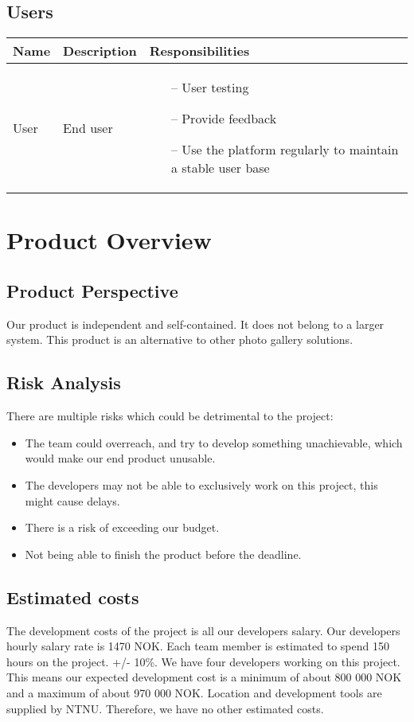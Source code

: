 \documentclass{article}
\begin{document}
\subsection{Users}
\begin{tabularx}{1.0\textwidth} { 
  | >{\raggedright\arraybackslash}X 
  | >{\raggedright\arraybackslash}X
  | >{\raggedright\arraybackslash}X | }
    \hline
    \rowcolor{lightgray} Name & Description & Responsibilities \\
    \hline
    User & End user & \begin{itemize}
        \item[--] User testing
        \item[--] Provide feedback
        \item[--] Use the platform regularly to maintain a stable user base
    \end{itemize}{} \\
    \hline
\end{tabularx}


\section{Product Overview}
\subsection{Product Perspective}
Our product is independent and self-contained. It does not belong to a larger system. This product is an alternative to other photo gallery solutions. 
\subsection{Risk Analysis}
There are multiple risks which could be detrimental to the project: 
\begin{itemize}
\item The team could overreach, and try to develop something unachievable, which would make our end product unusable.
\item The developers may not be able to exclusively work on this project, this might cause delays.
\item There is a risk of exceeding our budget.
\item Not being able to finish the product before the deadline.
\end{itemize}
\subsection{Estimated costs}
The development costs of the project is all our developers salary. Our developers hourly salary rate is 1470 NOK.
Each team member is estimated to spend 150 hours on the project. +/- 10\%.
We have four developers working on this project. This means our expected development cost is a minimum of about 800 000 NOK and a maximum of about 970 000 NOK. 
Location and development tools are supplied by NTNU. Therefore, we have no other estimated costs.
\end{document}
